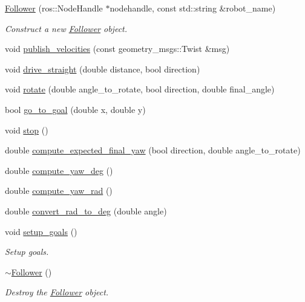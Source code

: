 \begin{DoxyCompactItemize}
\item 
\hyperlink{class_follower_a6870e654b7cc901944ead12870a6b107}{Follower} (ros\+::\+Node\+Handle $\ast$nodehandle, const std\+::string \&robot\+\_\+name)
\begin{DoxyCompactList}\small\item\em Construct a new \hyperlink{class_follower}{Follower} object. \end{DoxyCompactList}\item 
void \hyperlink{class_follower_aaae1600959a929c269d557d9c09ba777}{publish\+\_\+velocities} (const geometry\+\_\+msgs\+::\+Twist \&msg)
\item 
void \hyperlink{class_follower_ad4d1ce6f43ce65c0aa5a560247ca55ad}{drive\+\_\+straight} (double distance, bool direction)
\item 
void \hyperlink{class_follower_abf8ec0da50295140bf750d30906a726b}{rotate} (double angle\+\_\+to\+\_\+rotate, bool direction, double final\+\_\+angle)
\item 
bool \hyperlink{class_follower_a08ab05cb32f0e6653939163dd22f344a}{go\+\_\+to\+\_\+goal} (double x, double y)
\item 
void \hyperlink{class_follower_a84c17a75630c27bea4f401c8ab8e45b2}{stop} ()
\item 
double \hyperlink{class_follower_a5573bec72ce4aed99706213154849b65}{compute\+\_\+expected\+\_\+final\+\_\+yaw} (bool direction, double angle\+\_\+to\+\_\+rotate)
\item 
double \hyperlink{class_follower_ac988cad87474cb64ef3be7fe197d90a7}{compute\+\_\+yaw\+\_\+deg} ()
\item 
double \hyperlink{class_follower_abde593631e6549062d77fb2169a17c66}{compute\+\_\+yaw\+\_\+rad} ()
\item 
double \hyperlink{class_follower_a670f07466502e1020514d6ba6b928553}{convert\+\_\+rad\+\_\+to\+\_\+deg} (double angle)
\item 
void \hyperlink{class_follower_a9ff755f0d81808c372bfcaac0a45471c}{setup\+\_\+goals} ()
\begin{DoxyCompactList}\small\item\em Setup goals. \end{DoxyCompactList}\item 
\hyperlink{class_follower_a1dd55289af5ded7a57a2874c5477c33d}{$\sim$\+Follower} ()
\begin{DoxyCompactList}\small\item\em Destroy the \hyperlink{class_follower}{Follower} object. \end{DoxyCompactList}\end{DoxyCompactItemize}
